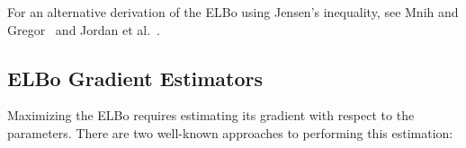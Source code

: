 
For an alternative derivation of the ELBo using Jensen's inequality, see Mnih and Gregor~\cite{NVIL} and Jordan et al.~\cite[p. 213]{VariationalInference}.

\subsection{ELBo Gradient Estimators}

Maximizing the ELBo requires estimating its gradient with respect to the parameters.
There are two well-known approaches to performing this estimation:

